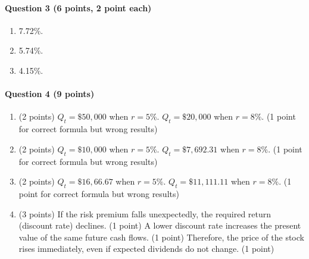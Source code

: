 \documentclass[12pt]{article}
\begin{document}
\paragraph{Question 3 (6 points, 2 point each)}
\begin{enumerate}[label=\alph*.]
    \item 7.72\%.
    \item 5.74\%.
    \item 4.15\%.
\end{enumerate}

\paragraph{Question 4 (9 points)}
\begin{enumerate}[label=\alph*.]
    \item (2 points) $Q_t=\$50,000$ when $r=5\%$. $Q_t=\$20,000$ when $r=8\%$. (1 point for correct formula but wrong results)
    \item (2 points) $Q_t=\$10,000$ when $r=5\%$. $Q_t=\$7,692.31$ when $r=8\%$. (1 point for correct formula but wrong results)
    \item (2 points) $Q_t=\$16,66.67$ when $r=5\%$. $Q_t=\$11,111.11$ when $r=8\%$. (1 point for correct formula but wrong results)
    \item (3 points) If the risk premium falls unexpectedly, the required return (discount rate) declines. (1 point) A lower discount rate increases the present value of the same future cash flows. (1 point) Therefore, the price of the stock rises immediately, even if expected dividends do not change. (1 point)
\end{enumerate}
\end{document}

